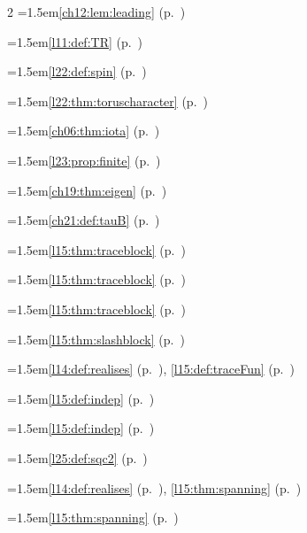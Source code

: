 \begin{multicols}{2}
\hangindent=1.5em\quad \ref{ch12:lem:leading} (p.~\pageref{ch12:lem:leading})\par
\hangindent=1.5em\quad \ref{l11:def:TR} (p.~\pageref{l11:def:TR})\par
\hangindent=1.5em\quad \ref{l22:def:spin} (p.~\pageref{l22:def:spin})\par
\hangindent=1.5em\quad \ref{l22:thm:toruscharacter} (p.~\pageref{l22:thm:toruscharacter})\par
\hangindent=1.5em\quad \ref{ch06:thm:iota} (p.~\pageref{ch06:thm:iota})\par
\hangindent=1.5em\quad \ref{l23:prop:finite} (p.~\pageref{l23:prop:finite})\par
\hangindent=1.5em\quad \ref{ch19:thm:eigen} (p.~\pageref{ch19:thm:eigen})\par
\hangindent=1.5em\quad \ref{ch21:def:tauB} (p.~\pageref{ch21:def:tauB})\par
\hangindent=1.5em\quad \ref{l15:thm:traceblock} (p.~\pageref{l15:thm:traceblock})\par
\hangindent=1.5em\quad \ref{l15:thm:traceblock} (p.~\pageref{l15:thm:traceblock})\par
\hangindent=1.5em\quad \ref{l15:thm:traceblock} (p.~\pageref{l15:thm:traceblock})\par
\hangindent=1.5em\quad \ref{l15:thm:slashblock} (p.~\pageref{l15:thm:slashblock})\par
\hangindent=1.5em\quad \ref{l14:def:realises} (p.~\pageref{l14:def:realises}), \ref{l15:def:traceFun} (p.~\pageref{l15:def:traceFun})\par
\hangindent=1.5em\quad \ref{l15:def:indep} (p.~\pageref{l15:def:indep})\par
\hangindent=1.5em\quad \ref{l15:def:indep} (p.~\pageref{l15:def:indep})\par
\hangindent=1.5em\quad \ref{l25:def:sqc2} (p.~\pageref{l25:def:sqc2})\par
\hangindent=1.5em\quad \ref{l14:def:realises} (p.~\pageref{l14:def:realises}), \ref{l15:thm:spanning} (p.~\pageref{l15:thm:spanning})\par
\hangindent=1.5em\quad \ref{l15:thm:spanning} (p.~\pageref{l15:thm:spanning})\par

\end{multicols}
